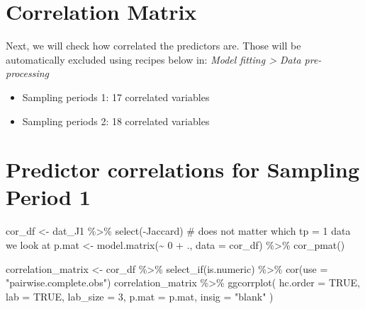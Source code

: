 \documentclass[
  letterpaper,
  DIV=11,
  numbers=noendperiod]{scrreprt}
\newenvironment{Shaded}{\begin{snugshade}}{\end{snugshade}}
\newcommand{\AttributeTok}[1]{\textcolor[rgb]{0.40,0.45,0.13}{#1}}
\newcommand{\CommentTok}[1]{\textcolor[rgb]{0.37,0.37,0.37}{#1}}
\newcommand{\ConstantTok}[1]{\textcolor[rgb]{0.56,0.35,0.01}{#1}}
\newcommand{\DecValTok}[1]{\textcolor[rgb]{0.68,0.00,0.00}{#1}}
\newcommand{\FunctionTok}[1]{\textcolor[rgb]{0.28,0.35,0.67}{#1}}
\newcommand{\NormalTok}[1]{\textcolor[rgb]{0.00,0.23,0.31}{#1}}
\newcommand{\OtherTok}[1]{\textcolor[rgb]{0.00,0.23,0.31}{#1}}
\newcommand{\SpecialCharTok}[1]{\textcolor[rgb]{0.37,0.37,0.37}{#1}}
\newcommand{\StringTok}[1]{\textcolor[rgb]{0.13,0.47,0.30}{#1}}
\providecommand{\tightlist}{%
  \setlength{\itemsep}{0pt}\setlength{\parskip}{0pt}}\usepackage{longtable,booktabs,array}
\begin{document}
\section{Correlation Matrix}\label{correlation-matrix}

Next, we will check how correlated the predictors are. Those will be
automatically excluded using recipes below in: \emph{Model fitting
\textgreater{} Data pre-processing}

\begin{itemize}
\tightlist
\item
  Sampling periods 1: 17 correlated variables
\item
  Sampling periods 2: 18 correlated variables
\end{itemize}

\section{Predictor correlations for Sampling Period 1}

\begin{Shaded}
\begin{Highlighting}[]
\NormalTok{cor\_df }\OtherTok{\textless{}{-}}\NormalTok{ dat\_J1 }\SpecialCharTok{\%\textgreater{}\%} \FunctionTok{select}\NormalTok{(}\SpecialCharTok{{-}}\NormalTok{Jaccard) }\CommentTok{\# does not matter which tp = 1 data we look at}
\NormalTok{p.mat }\OtherTok{\textless{}{-}} \FunctionTok{model.matrix}\NormalTok{(}\SpecialCharTok{\textasciitilde{}} \DecValTok{0} \SpecialCharTok{+}\NormalTok{ ., }\AttributeTok{data =}\NormalTok{ cor\_df) }\SpecialCharTok{\%\textgreater{}\%}
    \FunctionTok{cor\_pmat}\NormalTok{()}

\NormalTok{correlation\_matrix }\OtherTok{\textless{}{-}}\NormalTok{ cor\_df }\SpecialCharTok{\%\textgreater{}\%}
    \FunctionTok{select\_if}\NormalTok{(is.numeric) }\SpecialCharTok{\%\textgreater{}\%}
    \FunctionTok{cor}\NormalTok{(}\AttributeTok{use =} \StringTok{"pairwise.complete.obs"}\NormalTok{)}
\NormalTok{correlation\_matrix }\SpecialCharTok{\%\textgreater{}\%}
    \FunctionTok{ggcorrplot}\NormalTok{(}
        \AttributeTok{hc.order =} \ConstantTok{TRUE}\NormalTok{,}
        \AttributeTok{lab =} \ConstantTok{TRUE}\NormalTok{,}
        \AttributeTok{lab\_size =} \DecValTok{3}\NormalTok{,}
        \AttributeTok{p.mat =}\NormalTok{ p.mat,}
        \AttributeTok{insig =} \StringTok{"blank"}
\NormalTok{    )}
\end{Highlighting}
\end{Shaded}
\end{document}
